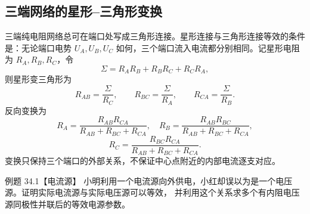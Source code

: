 \subsection*{三端网络的星形--三角形变换}

三端纯电阻网络总可在端口处写成三角形连接。星形连接与三角形连接等效的条件是：无论端口电势
$U_A,U_B,U_C$ 如何，三个端口流入电流都分别相同。记星形电阻为 $R_A,R_B,R_C$，令
\begin{equation}
  \Sigma=R_AR_B+R_BR_C+R_CR_A,
\end{equation}
则星形变三角形为
\begin{equation}
  \boxed{R_{AB}=\frac{\Sigma}{R_C}},\qquad
  \boxed{R_{BC}=\frac{\Sigma}{R_A}},\qquad
  \boxed{R_{CA}=\frac{\Sigma}{R_B}}.
\end{equation}
反向变换为
\begin{equation}
  \boxed{R_A=\frac{R_{AB}R_{CA}}{R_{AB}+R_{BC}+R_{CA}}},
  \quad
  \boxed{R_B=\frac{R_{AB}R_{BC}}{R_{AB}+R_{BC}+R_{CA}}},
\end{equation}
\begin{equation}
  \boxed{R_C=\frac{R_{BC}R_{CA}}{R_{AB}+R_{BC}+R_{CA}}}.
\end{equation}
变换只保持三个端口的外部关系，不保证中心点附近的内部电流逐支对应。

\starDeltaDiagram

\Needspace{0.34\textheight}


\begin{origexamplebox}{例题 34.1【电流源】}
小明利用一个电流源向外供电，小红却误以为是一个电压源。证明实际电流源与实际电压源可以等效，
并利用这个关系求多个有内阻电压源同极性并联后的等效电源参数。
\end{origexamplebox}

